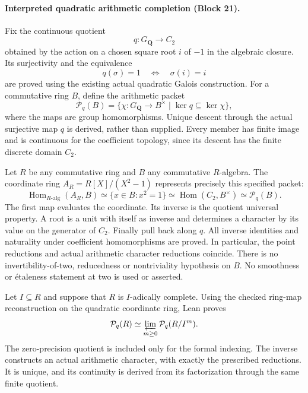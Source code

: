 \documentclass[11pt]{article}
\theoremstyle{definition}
\theoremstyle{remark}
\newcommand{\Q}{\mathbf Q}
\newcommand{\Hom}{\operatorname{Hom}}
\begin{document}
\paragraph{Interpreted quadratic arithmetic completion (Block 21).}
Fix the continuous quotient
\[
q:G_{\Q}\longrightarrow C_2
\]
obtained by the action on a chosen square root $i$ of $-1$ in the algebraic
closure. Its surjectivity and the equivalence
\[
q(\sigma)=1\quad\Longleftrightarrow\quad\sigma(i)=i
\]
are proved using the existing actual quadratic Galois construction.
For a commutative ring $B$, define the arithmetic packet
\[
\mathcal P_q(B)=
\{\chi:G_{\Q}\longrightarrow B^\times\mid\ker q\subseteq\ker\chi\},
\]
where the maps are group homomorphisms. Unique descent through the actual
surjective map $q$ is derived, rather than supplied. Every member has finite
image and is continuous for the coefficient topology, since its descent
has the finite discrete domain $C_2$.

Let $R$ be any commutative ring and $B$ any commutative $R$-algebra. The
coordinate ring $A_R=R[X]/(X^2-1)$ represents precisely this specified
packet:
\[
\Hom_{R\text{-alg}}(A_R,B)
\simeq\{x\in B:x^2=1\}
\simeq\Hom(C_2,B^\times)
\simeq\mathcal P_q(B).
\]
The first map evaluates the coordinate. Its inverse is the quotient
universal property. A root is a unit with itself as inverse and determines
a character by its value on the generator of $C_2$. Finally pull back
along $q$. All inverse identities and naturality under coefficient
homomorphisms are proved. In particular, the point reductions and actual
arithmetic character reductions coincide. There is no invertibility-of-two,
reducedness or nontriviality hypothesis on $B$. No smoothness or
\'{e}taleness statement at two is used or asserted.

Let $I\subseteq R$ and suppose that $R$ is $I$-adically complete. Using
the checked ring-map reconstruction on the quadratic coordinate ring,
Lean proves
\[
\mathcal P_q(R)\simeq\varprojlim_{m\ge0}\mathcal P_q(R/I^m).
\]
The zero-precision quotient is included only for the formal indexing.
The inverse constructs an actual arithmetic character, with exactly the
prescribed reductions. It is unique, and its continuity is derived from
its factorization through the same finite quotient.
\end{document}
